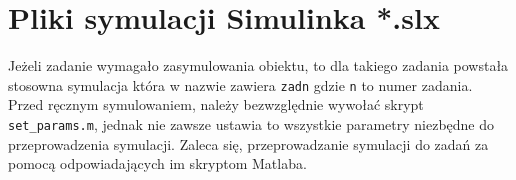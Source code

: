 \documentclass[a4paper,titlepage,11pt,floatssmall]{mwrep}
\begin{document}
\section{Pliki symulacji Simulinka *.slx}
\indent{} Jeżeli zadanie wymagało zasymulowania obiektu, to dla takiego zadania powstała stosowna symulacja która w nazwie zawiera \texttt{zadn} gdzie \texttt{n} to numer zadania. Przed ręcznym symulowaniem, należy bezwzględnie wywołać skrypt \texttt{set\_params.m}, jednak nie zawsze ustawia to wszystkie parametry niezbędne do przeprowadzenia symulacji. Zaleca się, przeprowadzanie symulacji do zadań za pomocą odpowiadających im skryptom Matlaba.
\end{document}
